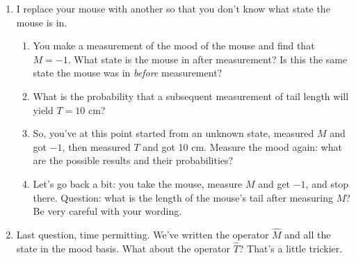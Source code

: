 \documentclass[10pt, letterpaper, twoside, openany]{article}
\begin{document}
\begin{enumerate}
\begin{enumerate}
\item You then re-measure the tail length $T$.  What results would you get, and with what probabilities?  What state is the mouse in after this second measurement?

\vspace{2in}

\item If you now measure the mood $M$ of the mouse, what are the possible results and probabilities?

\end{enumerate}

\newpage

\item I replace your mouse with another so that you don't know what state the mouse is in.  
\begin{enumerate}
\item You make a measurement of the mood of the mouse and find that $M = -1$.  What state is the mouse in after measurement?  Is this the same state the mouse was in \emph{before} measurement?

\vspace{1in}

\item What is the probability that a subsequent measurement of tail length will yield $T = 10$ cm?

\vspace{2in}

\item So, you've at this point started from an unknown state, measured $M$ and got $-1$, then measured $T$ and got 10 cm.  Measure the mood again: what are the possible results and their probabilities?

\vspace{3in}

\item Let's go back a bit: you take the mouse, measure $M$ and get $-1$, and stop there.  Question: what is the length of the mouse's tail after measuring $M$?  Be very careful with your wording.

\end{enumerate}

\newpage

\item Last question, time permitting.  We've written the operator $\hat{M}$ and all the state in the mood basis.  What about the operator $\hat{T}$?  That's a little trickier.


\end{enumerate}
\end{document}
